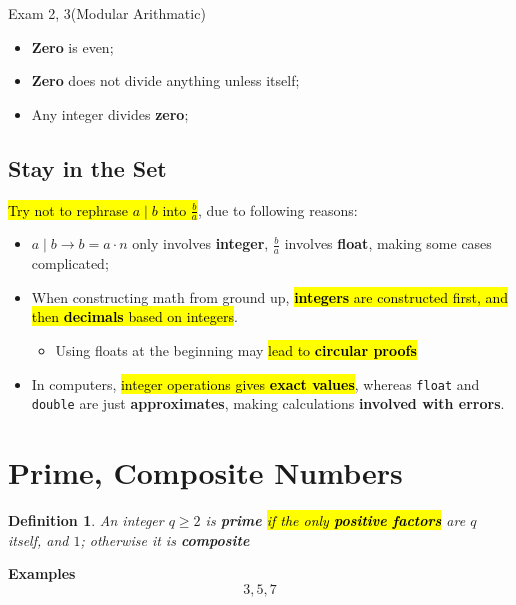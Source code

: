 \documentclass{note}
\newtheorem{definition}{Definition}
\begin{document}
\begin{note}{Exam 2, 3(Modular Arithmatic)}
        \begin{itemize}
            \item \textbf{Zero} is even;
            \item \textbf{Zero} does not divide anything unless itself;
            \item Any integer divides \textbf{zero};
        \end{itemize}

        \subsection{Stay in the Set}
        \hl{Try not to rephrase $ a \mid b $ into $ \frac{b}{a} $}, due to following reasons:
        \begin{itemize}
            \item $ a \mid b \to b = a \cdot n $ only involves \textbf{integer}, $ \frac{b}{a} $ involves
            \textbf{float}, making some cases complicated;

            \item When constructing math from ground up, \hl{\textbf{integers} are constructed first, and then
            \textbf{decimals} based on integers}.
            \begin{itemize}
                \item Using floats at the beginning may \hl{lead to \textbf{circular proofs}}
            \end{itemize}

            \item In computers, \hl{integer operations gives \textbf{exact values}}, whereas \texttt{float}
            and \texttt{double} are just \textbf{approximates}, making calculations \textbf{involved with errors}.
        \end{itemize}

        \section{Prime, Composite Numbers}

        \begin{definition}
            An integer $ q \geq 2 $ is \textbf{prime} \hl{if the only \textbf{positive factors}} are $ q $ itself, and $ 1 $;
            otherwise it is \textbf{composite}
        \end{definition}
        \textbf{Examples}
        \begin{displaymath}
            3, 5, 7
        \end{displaymath}


\end{note}
\end{document}
